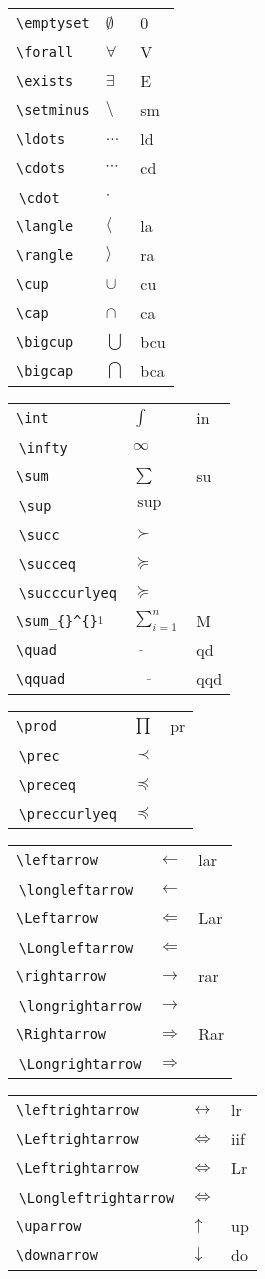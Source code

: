 \documentclass[10pt,landscape]{article}
\newcommand{\nl}{\\[.3ex]}
\newcommand{\nlt}{\\[1.2ex]}
\newcommand{\ct}{\rotatebox[origin=c]{180}{$\Lsh$}\,}
\newcommand{\cst}{$\stackrel{1}{}$}
\begin{document}
\begin{multicols*}{3}
\begin{tabular}{@{}p{}  @{}p{} %
                @{}p{\the\MyKeyLen}@{}}
    \verb!\emptyset! & $\emptyset$ & 0 \nl
    \verb!\forall! & $\forall$ & V \nl
    \verb!\exists! & $\exists$ & E \nl
    \verb!\setminus! & $\setminus$ &  sm \nl
    \verb!\ldots! & $\ldots$ &  ld \nl
    \verb!\cdots! & $\cdots$ &  cd \nl
    \ct \verb!\cdot! & $\cdot$ &  \nl
    \verb!\langle! & $\langle$ &  la \nl
    \verb!\rangle! & $\rangle$ &  ra \nl
    \verb!\cup! & $\cup$ &  cu \nl
    \verb!\cap! & $\cap$ &  ca \nl
    \verb!\bigcup! & $\bigcup$ &  bcu \nl
    \verb!\bigcap! & $\bigcap$ &  bca \nlt
\end{tabular}

\begin{tabular}{@{}p{}  @{}p{} %
                @{}p{\the\MyKeyLen}@{}}
    \verb!\int! & $\int$ &  in \nl
    \ct \verb!\infty! & $\infty$ &   \nl
    \verb!\sum! & $\sum$ &  su \nl
    \ct \verb!\sup! & $\sup$ &   \nl
    \ct \verb!\succ! & $\succ$ &   \nl
    \ct \verb!\succeq! & $\succeq$ &   \nl
    \ct \verb!\succcurlyeq! & $\succcurlyeq$ &   \nl
    \verb!\sum_{}^{}!\cst & $\sum_{i=1}^{n}$ &  M \nl
    \verb!\quad! & $\underline{\quad}$ &  qd \nl
    \verb!\qquad! & $\underline{\qquad}$ &  qqd \nl
\end{tabular}

\begin{tabular}{@{}p{}  @{}p{} %
                @{}p{\the\MyKeyLen}@{}}
    \verb!\prod! & $\prod$ &  pr \nl
    \ct \verb!\prec! & $\prec$ &   \nl
    \ct \verb!\preceq! & $\preceq$ &   \nl
    \ct \verb!\preccurlyeq! & $\preccurlyeq$ &   \nlt
\end{tabular}

\begin{tabular}{@{}p{}  @{}p{} %
                @{}p{\the\MyKeyLen}@{}}
    \verb!\leftarrow! & $\leftarrow$ & lar \nl
    \ct \verb!\longleftarrow! & $\longleftarrow$ &  \nl
    \verb!\Leftarrow! & $\Leftarrow$ & Lar \nl
    \ct \verb!\Longleftarrow! & $\Longleftarrow$ &  \nl
    \verb!\rightarrow! & $\rightarrow$ & rar \nl
    \ct \verb!\longrightarrow! & $\longrightarrow$ &  \nl
    \verb!\Rightarrow! & $\Rightarrow$ & Rar \nl
    \ct \verb!\Longrightarrow! & $\Longrightarrow$ &  \nl
\end{tabular}
\begin{tabular}{@{}p{}  @{}p{} %
                @{}p{\the\MyKeyLen}@{}}
    \verb!\leftrightarrow! & $\leftrightarrow$ & lr \nl
    \verb!\Leftrightarrow! & $\Leftrightarrow$ & iif \nl
    \verb!\Leftrightarrow! & $\Leftrightarrow$ & Lr \nl
    \ct \verb!\Longleftrightarrow! & $\Longleftrightarrow$ &  \nl
    \verb!\uparrow! & $\uparrow$ & up \nl
    \verb!\downarrow! & $\downarrow$ & do \nlt
\end{tabular}


\end{multicols*}
\end{document}
